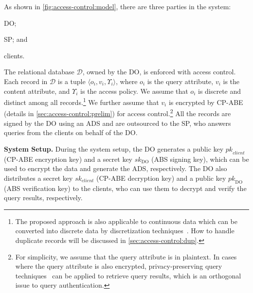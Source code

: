 As shown in \cref{fig:access-control:model}, there are three parties in the system:
\begin{inlineenum}
\item DO\@;
\item SP\@; and
\item clients.
\end{inlineenum}
The relational database $\mathcal{D}$, owned by the DO, is enforced with access control. Each record in $\mathcal{D}$ is a tuple $\langle o_i, v_i, \Upsilon_i\rangle$, where $o_i$ is the query attribute, $v_i$ is the content attribute, and $\Upsilon_i$ is the access policy. We assume that $o_i$ is discrete and distinct among all records.\footnote{The proposed approach is also applicable to continuous data which can be converted into discrete data by discretization techniques~\cite{Kotsiantis2006}. How to handle duplicate records will be discussed in \cref{sec:access-control:dup}.} We further assume that $v_i$ is encrypted by CP-ABE~\cite{10.1109/sp.2007.11} (details in \cref{sec:access-control:prelim}) for access control.\footnote{For simplicity, we assume that the query attribute is in plaintext. In cases where the query attribute is also encrypted,
privacy-preserving query techniques~\cite{10.1145/2699026.2699101} can be applied to retrieve query results, which is an orthogonal issue to query authentication.}
All the records are signed by the DO using an ADS and are outsourced to the SP, who answers queries from the clients on behalf of the DO\@.

\textbf{System Setup.}
During the system setup, the DO generates a public key ${pk}_{client}$ (CP-ABE encryption key) and a secret key ${sk}_\text{DO}$ (ABS signing key), which can be used to encrypt the data and generate the ADS, respectively. The DO also distributes a secret key ${sk}_{client}$ (CP-ABE decryption key) and a public key ${pk}_\text{DO}$ (ABS verification key) to the clients, who can use them to decrypt and verify the query results, respectively.

